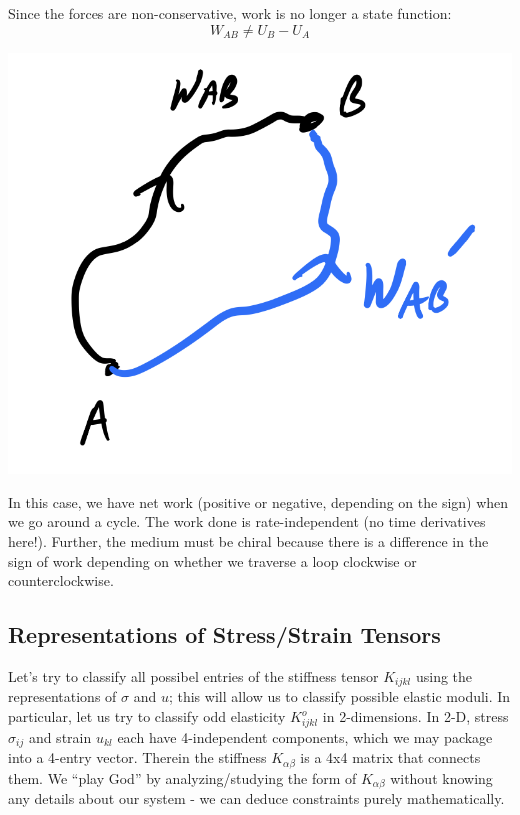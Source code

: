 Since the forces are non-conservative, work is no longer a state function:
\begin{equation}
    W_{AB} \neq U_B - U_A
\end{equation}
\begin{center}
    \includegraphics[scale=0.3]{Lectures/Images/lec2-work.png}
\end{center}
In this case, we have net work (positive or negative, depending on the sign) when we go around a cycle. The work done is rate-independent (no time derivatives here!). Further, the medium must be chiral because there is a difference in the sign of work depending on whether we traverse a loop clockwise or counterclockwise.

\subsection{Representations of Stress/Strain Tensors}
Let's try to classify all possibel entries of the stiffness tensor $K_{ijkl}$ using the representations of $\sigma$ and $u$; this will allow us to classify possible elastic moduli. In particular, let us try to classify odd elasticity $K^o_{ijkl}$ in 2-dimensions. In 2-D, stress $\sigma_{ij}$ and strain $u_{kl}$ each have 4-independent components, which we may package into a 4-entry vector. Therein the stiffness $K_{\alpha\beta}$ is a 4x4 matrix that connects them. We ``play God'' by analyzing/studying the form of $K_{\alpha\beta}$ without knowing any details about our system - we can deduce constraints purely mathematically.

